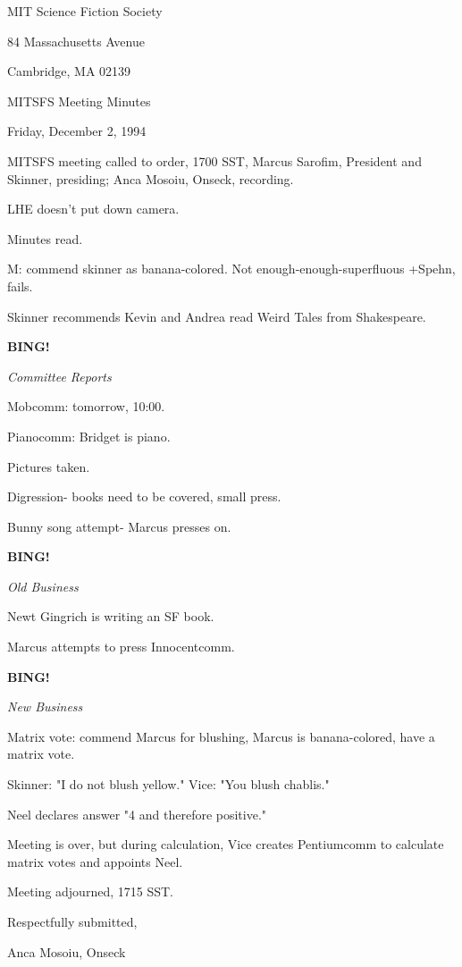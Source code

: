 \documentclass[12pt]{article}
\newcommand{\bing}{{\bf BING!} }
\newcommand{\goto}[1]{\bing \vskip 12pt \centerline{{\em{#1}}}}
\begin{document}
\begin{center}

MIT Science Fiction Society 

84 Massachusetts Avenue

Cambridge, MA 02139

\vspace{12pt}

MITSFS Meeting Minutes 

Friday, December 2, 1994

\end{center}
 
\vspace{18pt}

\setlength{\parskip}{6pt}

\noindent
MITSFS meeting called to order, 1700 SST,
Marcus Sarofim, President and Skinner, presiding; Anca Mosoiu, Onseck, recording.

LHE doesn't put down camera.

Minutes read.

M: commend skinner as banana-colored. Not enough-enough-superfluous +Spehn, fails.

Skinner recommends Kevin and Andrea read Weird Tales from Shakespeare.

\goto{Committee Reports}

Mobcomm: tomorrow, 10:00.

Pianocomm: Bridget is piano.

Pictures taken.

Digression- books need to be covered, small press.

Bunny song attempt- Marcus presses on.

\goto{Old Business}

Newt Gingrich is writing an SF book.

Marcus attempts to press Innocentcomm.

\goto{New Business}

Matrix vote: commend Marcus for blushing, Marcus is banana-colored, have a matrix vote.

Skinner: "I do not blush yellow." Vice: "You blush chablis."

Neel declares answer "4 and therefore positive."

Meeting is over, but during calculation, Vice creates Pentiumcomm to calculate matrix votes and appoints Neel.

\vspace{12pt}

\noindent
Meeting adjourned, 1715 SST.

\vspace{18pt}

\centerline{Respectfully submitted,}
\centerline{Anca Mosoiu, Onseck}
\end{document}
